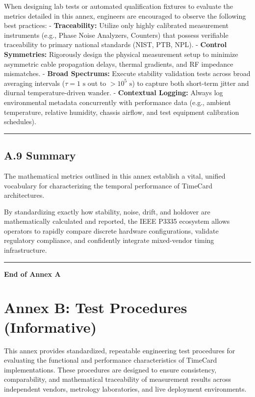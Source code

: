 When designing lab tests or automated qualification fixtures to evaluate
the metrics detailed in this annex, engineers are encouraged to observe
the following best practices: - \textbf{Traceability:} Utilize only
highly calibrated measurement instruments (e.g., Phase Noise Analyzers,
Counters) that possess verifiable traceability to primary national
standards (NIST, PTB, NPL). - \textbf{Control Symmetries:} Rigorously
design the physical measurement setup to minimize asymmetric cable
propagation delays, thermal gradients, and RF impedance mismatches. -
\textbf{Broad Spectrums:} Execute stability validation tests across
broad averaging intervals (\(\tau = 1\text{ s}\) out to
\(>10^5\text{ s}\)) to capture both short-term jitter and diurnal
temperature-driven wander. - \textbf{Contextual Logging:} Always log
environmental metadata concurrently with performance data (e.g., ambient
temperature, relative humidity, chassis airflow, and test equipment
calibration schedules).

\begin{center}\rule{0.5\linewidth}{0.5pt}\end{center}

\subsection{A.9 Summary}\label{a.9-summary}

The mathematical metrics outlined in this annex establish a vital,
unified vocabulary for characterizing the temporal performance of
TimeCard architectures.

By standardizing exactly how stability, noise, drift, and holdover are
mathematically calculated and reported, the IEEE P3335 ecosystem allows
operators to rapidly compare discrete hardware configurations, validate
regulatory compliance, and confidently integrate mixed-vendor timing
infrastructure.

\begin{center}\rule{0.5\linewidth}{0.5pt}\end{center}

\textbf{End of Annex A}

\section{Annex B: Test Procedures
(Informative)}\label{annex-b-test-procedures-informative}

This annex provides standardized, repeatable engineering test procedures
for evaluating the functional and performance characteristics of
TimeCard implementations. These procedures are designed to ensure
consistency, comparability, and mathematical traceability of measurement
results across independent vendors, metrology laboratories, and live
deployment environments.

